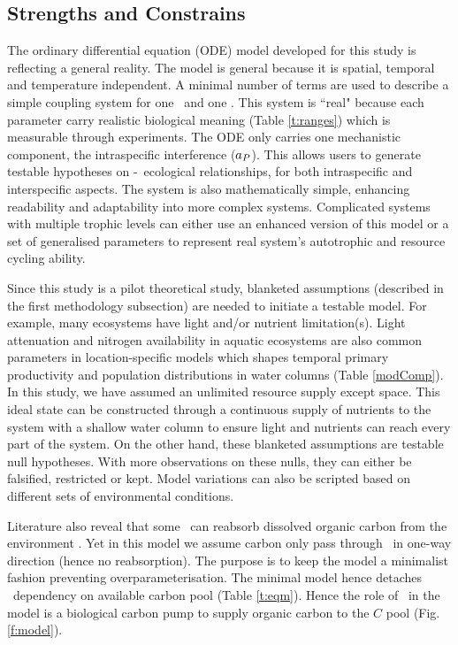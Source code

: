 \documentclass[../thesis.tex]{subfiles} %
\begin{document}
\subsection{Strengths and Constrains}
The ordinary differential equation (ODE) model developed for this study is reflecting a general reality.  The model is general because it is spatial, temporal and temperature independent.  A minimal number of terms are used to describe a simple coupling system for one \phy\ and one \bac.  This system is ``real" because each parameter carry realistic biological meaning (Table \ref{t:ranges}) which is measurable through experiments.  The ODE only carries one mechanistic component, the intraspecific interference ($a_P$).  This allows users to generate testable hypotheses on \phy-\bac\ ecological relationships, for both intraspecific and interspecific aspects.  The system is also mathematically simple, enhancing readability and adaptability into more complex systems.  Complicated systems with multiple trophic levels can either use an enhanced version of this model or a set of generalised parameters to represent real system's autotrophic and resource cycling ability.

Since this study is a pilot theoretical study, blanketed assumptions (described in the first methodology subsection) are needed to initiate a testable model.  For example, many ecosystems have light and/or nutrient limitation(s).  Light attenuation and nitrogen availability in aquatic ecosystems are also common parameters in location-specific models which shapes temporal primary productivity and population distributions in water columns (Table \ref{modComp}).  In this study, we have assumed an unlimited resource supply except space.  This ideal state can be constructed through a continuous supply of nutrients to the system with a shallow water column to ensure light and nutrients can reach every part of the system.  On the other hand, these blanketed assumptions are testable null hypotheses.  With more observations on these nulls, they can either be falsified, restricted or kept.  Model variations can also be scripted based on different sets of environmental conditions.

Literature also reveal that some \phy\ can reabsorb dissolved organic carbon from the environment \autocite{j1989respiration,samejima1958heterotrophic}.  Yet in this model we assume carbon only pass through \phy\ in one-way direction (hence no reabsorption).  The purpose is to keep the model a minimalist fashion preventing overparameterisation.  The minimal model hence detaches \phy\ dependency on available carbon pool (Table \ref{t:eqm}).  Hence the role of \phy\ in the model is a biological carbon pump to supply organic carbon to the $C$ pool (Fig.\ref{f:model}).
\end{document}
